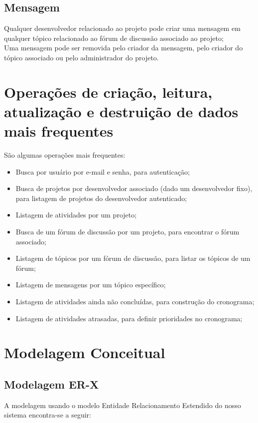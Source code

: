 \documentclass{article}
\begin{document}
	\subsection{Mensagem}
	Qualquer desenvolvedor relacionado ao projeto pode criar uma mensagem em qualquer tópico relacionado ao fórum de discussão associado ao projeto;\\
	Uma mensagem pode ser removida pelo criador da mensagem, pelo criador do tópico associado ou pelo administrador do projeto.


\section{Operações de criação, leitura, atualização e destruição de dados mais frequentes}

	São algumas operações mais frequentes:
	
	\begin{itemize}
		\item Busca por usuário por e-mail e senha, para autenticação;
		\item Busca de projetos por desenvolvedor associado (dado um desenvolvedor fixo), para listagem de projetos do desenvolvedor autenticado;
		\item Listagem de atividades por um projeto;
		\item Busca de um fórum de discussão por um projeto, para encontrar o fórum associado;
		\item Listagem de tópicos por um fórum de discussão, para listar os tópicos de um fórum;
		\item Listagem de mensagens por um tópico específico;
		\item Listagem de atividades ainda não concluídas, para construção do cronograma;
		\item Listagem de atividades atrasadas, para definir prioridades no cronograma;
	\end{itemize}

\section{Modelagem Conceitual}

	\subsection{Modelagem ER-X}
	A modelagem usando o modelo Entidade Relacionamento Estendido do nosso sistema encontra-se a seguir:
\end{document}
